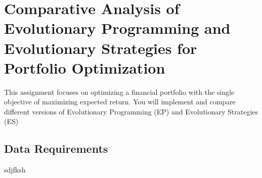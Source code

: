 \section{Comparative Analysis of Evolutionary Programming and Evolutionary Strategies for Portfolio Optimization}
This assignment focuses on optimizing a financial portfolio with the single objective of 
maximizing expected return. You will implement and compare different versions of 
Evolutionary Programming (EP) and Evolutionary Strategies (ES) 
\subsection{Data Requirements}
sdjfksh



